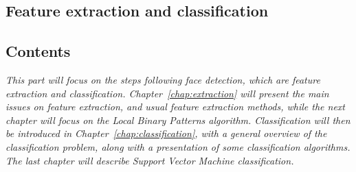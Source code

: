   \begin{titlepage}
    \vspace*{\fill}
      \part{Feature extraction and classification}
    \vspace*{\fill}
  \end{titlepage}

\startcontents[parts]

\chapter*{Contents}

\textit{This part will focus on the steps following face detection, which are feature extraction and classification. Chapter~\ref{chap:extraction} will present the main issues on feature extraction, and usual feature extraction methods, while the next chapter will focus on the Local Binary Patterns algorithm. Classification will then be introduced in Chapter~\ref{chap:classification}, with a general overview of the classification problem, along with a presentation of some classification algorithms. The last chapter will describe Support Vector Machine classification.}

\vspace{\baselineskip}


\pagebreak


\newpage

\newpage

\newpage


\stopcontents[parts]


